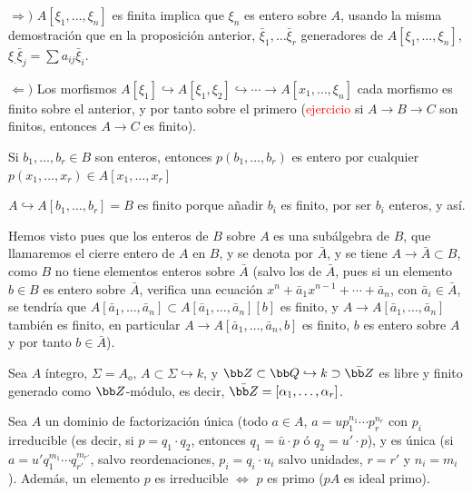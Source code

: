 \begin{dem}
    $\Rightarrow)$ $A[\xi_1, \ldots, \xi_n]$ es finita implica que $\xi_n$ es entero sobre $A$, usando la misma demostraci\'on que en la proposici\'on anterior, $\bar \xi_1, \ldots \bar \xi_r$ generadores de $A[\xi_1, \ldots, \xi_n]$, $\xi_ \cdot \bar \xi_j = \sum a_{ij} \bar \xi_i$. 

    $\Leftarrow)$ Los morfismos $A[\xi_1] \hookrightarrow A[\xi_1,\xi_2] \hookrightarrow \cdots \longrightarrow A[x_1, \ldots, \xi_n]$ cada morfismo es finito sobre el anterior, y por tanto sobre el primero (\textcolor{red}{ejercicio} si $A \to B \to C$ son finitos, entonces $A \to C$ es finito). 
\end{dem}
\begin{lem}
    Si $b_1, \ldots, b_r \in B$ son enteros, entonces $p(b_1, \ldots, b_r)$ es entero por cualquier $p(x_1, \ldots, x_r) \in A[x_1, \ldots, x_r] $
\end{lem}
\begin{dem}
    $A \hookrightarrow A[b_1, \ldots, b_r] = B$ es finito porque añadir $b_i$ es finito, por ser $b_i$ enteros, y as\'i.
\end{dem}
\begin{obs}
    Hemos visto pues que los enteros de $B$ sobre $A$ es una sub\'algebra de $B$, que llamaremos el cierre entero de $A$ en $B$, y se denota por $\bar A$, y se tiene $A \to \bar A \subset B$, como $B$ no tiene elementos enteros sobre $\bar A$ (salvo los de $\bar A$, pues si un elemento $b \in B$ es entero sobre $\bar A$, verifica una ecuaci\'on $x^n + \bar a_1 x^{n-1} +\cdots +\bar a_n$, con $\bar a_i \in \bar A$, se tendr\'ia que $A[\bar a_1, \ldots, \bar a_n]\subset  A[\bar a_1, \ldots, \bar a_n][b]$ es finito, y $A \to A[\bar a_1, \ldots, \bar a_n]$ tambi\'en es finito, en particular $A\to A[\bar a_1, \ldots, \bar a_n,b]$ es finito, $b$ es entero sobre $A$ y por tanto $b\in \bar A$). 
\end{obs}
\begin{ejem}
    Sea $A$ \'integro, $\Sigma=A_o, \, A \subset \Sigma \hookrightarrow k$, y $\bb Z \subset \bb Q\hookrightarrow k \supset \bar{ \bb Z}$ es libre y finito generado como $\bb Z$-m\'odulo, es decir, $\bar {\bb Z} = [\alpha_1, \ldots, \alpha_r]$.
\end{ejem}
\begin{custom}
    Sea $A$ un dominio de factorizaci\'on \'unica (todo $a\in A$, $a=u p_1^{n_1} \cdots p_r^{n_r}$ con $p_i$ irreducible (es decir, si $p=q_1\cdot q_2$, entonces $q_1 = \bar u \cdot p$ \'o $q_2 = u' \cdot p$), y es \'unica (si $a = u' q_1^{m_1} \cdots q_{r'}^{m_{r'}}$, salvo reordenaciones, $p_i=q_i\cdot u_i$ salvo unidades, $r=r'$ y $n_i = m_i$). Adem\'as, un elemento $p$ es irreducible $\iff$ $p$ es primo ($pA$ es ideal primo).  
\end{custom}
